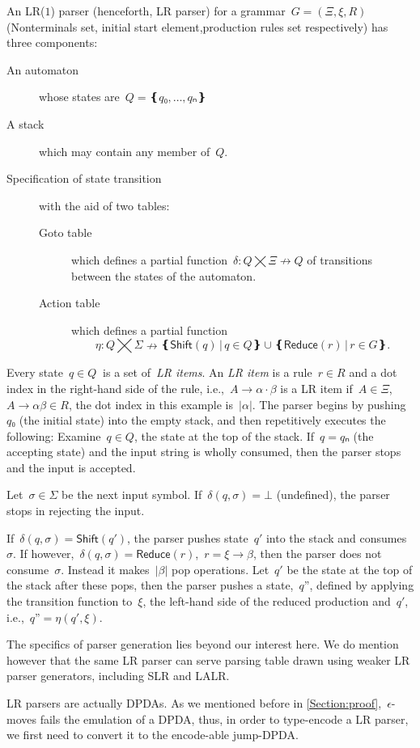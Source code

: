 An LR($1$) parser (henceforth, LR parser) for a grammar~$G=(Ξ,ξ,R)$ (Nonterminals set, initial start element,production rules set respectively)
  has three components:
\begin{description}
  \item[An automaton] whose states are~$Q=❴q₀,…,qₙ❵$
  \item[A stack] which may contain any member of~$Q$.
  \item[Specification of state transition] with the aid of two tables:
  \begin{description}
    \item[Goto table] which defines a partial function~$δ:Q⨉Ξ↛Q$ of transitions
    between the states of the automaton.
    \item[Action table] which
    defines a partial function\[η:Q⨉Σ↛ ❴ \textsf{Shift}(q) \,|\, q∈Q❵ ∪ ❴\textsf{Reduce}(r) \,| \, r∈G❵.\]
  \end{description}
\end{description}
Every state~$q∈Q~$ is a set of~\emph{LR items}.
  An \emph{LR item} is a rule~$r∈R$ and a dot index in the right-hand side of the rule,
  i.e.,~$A→α·β$ is a LR item if~$A∈Ξ$,~$A→αβ∈R$,
  the dot index in this example is~$|α|$.
The parser begins by pushing~$q₀$ (the initial state) into the empty stack,
and then repetitively executes the following:
Examine~$q∈Q$, the state at the top of the stack.
If~$q=qₙ$ (the accepting state) and the input string is wholly consumed, then the parser stops and the input is accepted.

Let~$σ∈Σ$ be the next input symbol.
If~$δ(q,σ)=⊥$ (undefined), the parser stops in rejecting the input.

If~$δ(q,σ) = \textsf{Shift}(q')$, the parser pushes state~$q'$
into the stack and consumes~$σ$.
If however,~$δ(q,σ) = \textsf{Reduce}(r)$,~$r=ξ→β$,
then the parser does not consume~$σ$.
Instead it makes~$|β|$ pop operations.
Let~$q'$ be the state at the top of the stack after these pops, then
the parser pushes a state,~$q”$,
defined by applying the transition function to~$ξ$, the left-hand side of the reduced production and~$q'$,
i.e.,~$q”=η(q',ξ)$.

The specifics of parser generation lies beyond our interest here.
We do mention however that the same LR parser can serve parsing table drawn using weaker LR parser generators,
including SLR and LALR\@.

LR parsers are actually DPDAs\@. As we mentioned before in \cref{Section:proof},~$\epsilon$-moves 
  fails the emulation of a DPDA, thus, in order to type-encode a LR parser, we first need 
  to convert it to the encode-able jump-DPDA\@.

